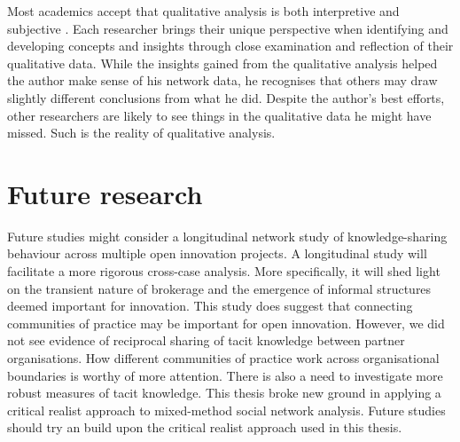 Most academics accept that qualitative analysis is both interpretive and subjective \citep{aspers2019qualitative}. Each researcher brings their unique perspective when identifying and developing concepts and insights through close examination and reflection of their qualitative data. While the insights gained from the qualitative analysis helped the author make sense of his network data, he recognises that others may draw slightly different conclusions from what he did. Despite the author's best efforts, other researchers are likely to see things in the qualitative data he might have missed. Such is the reality of qualitative analysis. \medskip

\section{Future research}

Future studies might consider a longitudinal network study of knowledge-sharing behaviour across multiple open innovation projects. A longitudinal study will facilitate a more rigorous cross-case analysis. More specifically, it will shed light on the transient nature of brokerage and the emergence of informal structures deemed important for innovation. This study does suggest that connecting communities of practice may be important for open innovation. However, we did not see evidence of reciprocal sharing of tacit knowledge between partner organisations. How different communities of practice work across organisational boundaries is worthy of more attention. There is also a need to investigate more robust measures of tacit knowledge. This thesis broke new  ground in applying a critical realist approach to mixed-method social network analysis. Future studies should try an build upon the critical realist approach used in this thesis.
